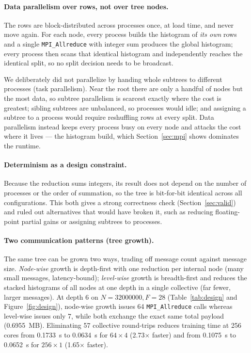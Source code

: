 \documentclass[11pt]{article}
\begin{document}
\paragraph{Data parallelism over rows, not over tree nodes.}
The rows are block-distributed across processes once, at load time, and never move again. For each node, every process builds the histogram of \emph{its own} rows and a single \texttt{MPI\_Allreduce} with integer sum produces the global histogram; every process then scans that identical histogram and independently reaches the identical split, so no split decision needs to be broadcast.

We deliberately did not parallelize by handing whole subtrees to different processes (task parallelism). Near the root there are only a handful of nodes but the most data, so subtree parallelism is scarcest exactly where the cost is greatest; sibling subtrees are unbalanced, so processes would idle; and assigning a subtree to a process would require reshuffling rows at every split. Data parallelism instead keeps every process busy on every node and attacks the cost where it lives --- the histogram build, which Section~\ref{sec:mpi} shows dominates the runtime.

\paragraph{Determinism as a design constraint.}
Because the reduction sums integers, its result does not depend on the number of processes or the order of summation, so the tree is bit-for-bit identical across all configurations. This both gives a strong correctness check (Section~\ref{sec:valid}) and ruled out alternatives that would have broken it, such as reducing floating-point partial gains or assigning subtrees to processes.

\paragraph{Two communication patterns (tree growth).}
The same tree can be grown two ways, trading off message count against message size. \emph{Node-wise} growth is depth-first with one reduction per internal node (many small messages, latency-bound); \emph{level-wise} growth is breadth-first and reduces the stacked histograms of all nodes at one depth in a single collective (far fewer, larger messages). At depth \num{6} on $N=\num{32000000}, F=\num{28}$ (Table~\ref{tab:design} and Figure~\ref{fig:design}), node-wise growth issues \num{64} \texttt{MPI\_Allreduce} calls whereas level-wise issues only \num{7}, while both exchange the exact same total payload (\SI{0.6955}{MB}). Eliminating \num{57} collective round-trips reduces training time at \num{256} cores from \SI{0.1733}{s} to \SI{0.0634}{s} for $64\times 4$ (\num{2.73}$\times$ faster) and from \SI{0.1075}{s} to \SI{0.0652}{s} for $256\times 1$ (\num{1.65}$\times$ faster).
\end{document}

